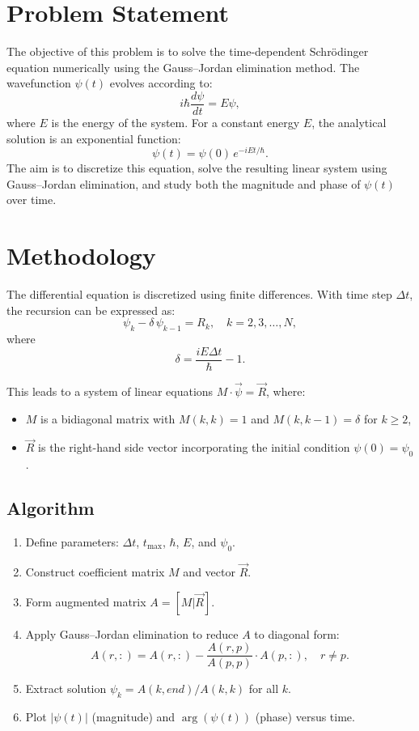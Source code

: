 \section*{Problem Statement} 
The objective of this problem is to solve the time-dependent Schrödinger equation numerically using the Gauss--Jordan elimination method. The wavefunction $\psi(t)$ evolves according to:
\[
i \hbar \frac{d\psi}{dt} = E \psi,
\]
where $E$ is the energy of the system. For a constant energy $E$, the analytical solution is an exponential function:
\[
\psi(t) = \psi(0) \, e^{-iEt/\hbar}.
\]
The aim is to discretize this equation, solve the resulting linear system using Gauss--Jordan elimination, and study both the magnitude and phase of $\psi(t)$ over time.

\section*{Methodology} 
The differential equation is discretized using finite differences. With time step $\Delta t$, the recursion can be expressed as:
\[
\psi_k - \delta \, \psi_{k-1} = R_k, \quad k=2,3,\dots,N,
\]
where
\[
\delta = \frac{iE\Delta t}{\hbar} - 1.
\]

This leads to a system of linear equations $M \cdot \vec{\psi} = \vec{R}$, where:
\begin{itemize}
  \item $M$ is a bidiagonal matrix with $M(k,k)=1$ and $M(k,k-1)=\delta$ for $k \geq 2$,
  \item $\vec{R}$ is the right-hand side vector incorporating the initial condition $\psi(0) = \psi_0$.
\end{itemize}

\subsection*{Algorithm}
\begin{enumerate}
  \item Define parameters: $\Delta t$, $t_{\max}$, $\hbar$, $E$, and $\psi_0$.
  \item Construct coefficient matrix $M$ and vector $\vec{R}$.
  \item Form augmented matrix $A = [M|\vec{R}]$.
  \item Apply Gauss--Jordan elimination to reduce $A$ to diagonal form:
  \[
  A(r,:) = A(r,:) - \frac{A(r,p)}{A(p,p)} \cdot A(p,:), \quad r \neq p.
  \]
  \item Extract solution $\psi_k = A(k,end)/A(k,k)$ for all $k$.
  \item Plot $|\psi(t)|$ (magnitude) and $\arg(\psi(t))$ (phase) versus time.
\end{enumerate}


